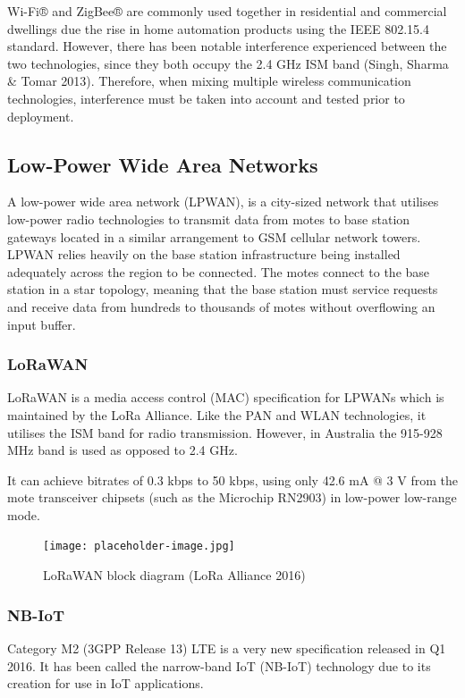 Wi-Fi® and ZigBee® are commonly used together in residential and commercial dwellings due the rise in home automation products using the IEEE 802.15.4 standard. However, there has been notable interference experienced between the two technologies, since they both occupy the 2.4 GHz ISM band (Singh, Sharma \& Tomar 2013). Therefore, when mixing multiple wireless communication technologies, interference must be taken into account and tested prior to deployment.

\subsection{Low-Power Wide Area Networks}

A low-power wide area network (LPWAN), is a city-sized network that utilises low-power radio technologies to transmit data from motes to base station gateways located in a similar arrangement to GSM cellular network towers. LPWAN relies heavily on the base station infrastructure being installed adequately across the region to be connected. The motes connect to the base station in a star topology, meaning that the base station must service requests and receive data from hundreds to thousands of motes without overflowing an input buffer.

\subsubsection{LoRaWAN}

LoRaWAN is a media access control (MAC) specification for LPWANs which is maintained by the LoRa Alliance. Like the PAN and WLAN technologies, it utilises the ISM band for radio transmission. However, in Australia the 915-928 MHz band is used as opposed to 2.4 GHz.

It can achieve bitrates of 0.3 kbps to 50 kbps, using only 42.6 mA @ 3 V from the mote transceiver chipsets (such as the Microchip RN2903) in low-power low-range mode.

\begin{figure}
    \centering
    \texttt{[image: placeholder-image.jpg]}
    \caption{LoRaWAN block diagram (LoRa Alliance 2016)}
    \label{fig:lorawan-block-diagram}
\end{figure}

\subsubsection{NB-IoT}

Category M2 (3GPP Release 13) LTE is a very new specification released in Q1 2016. It has been called the narrow-band IoT (NB-IoT) technology due to its creation for use in IoT applications.


